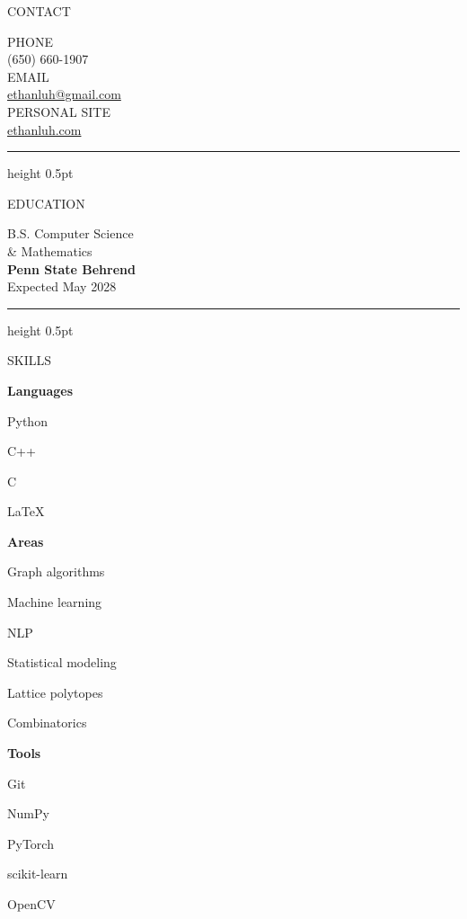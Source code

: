 \documentclass[10pt,letterpaper]{article}
\newcommand{\sechead}[1]{{\spacedboldfont\color{darktext}\fontsize{9.5}{11}\selectfont #1}\par\vspace{5pt}}
\newcommand{\subhead}[1]{{\bfseries\color{darktext}\fontsize{9.5}{12}\selectfont #1}}
\newcommand{\sidelabel}[1]{{\spacedfont\color{midgray}\fontsize{6.7}{9}\selectfont #1}}
\begin{document}
\begin{lrbox}{\sidebarbox}
\begin{minipage}[t]{2.55in}
\vspace{16pt}
\hspace{14pt}%
\begin{minipage}[t]{2.16in}

\sechead{CONTACT}
\sidelabel{PHONE}\\
{\fontsize{8.8}{12}\selectfont\color{darktext} (650) 660-1907}\\[7pt]
\sidelabel{EMAIL}\\
{\fontsize{8.8}{12}\selectfont\color{darktext} \href{mailto:ethanluh@gmail.com}{ethanluh@gmail.com}}\\[7pt]
\sidelabel{PERSONAL SITE}\\
{\fontsize{8.8}{12}\selectfont\color{darktext} \href{https://ethanluh.com}{ethanluh.com}}

\vspace{16pt}
{\color{lightrule}\hrule height 0.5pt}
\vspace{14pt}

\sechead{EDUCATION}
{\fontsize{8.8}{13}\selectfont\color{midgray} B.S. Computer Science\\ \& Mathematics}\\[3pt]
\subhead{\fontsize{9}{11}\selectfont Penn State Behrend}\\[2pt]
{\fontsize{8.3}{11.5}\selectfont\color{midgray} Expected May 2028}

\vspace{16pt}
{\color{lightrule}\hrule height 0.5pt}
\vspace{14pt}

\sechead{SKILLS}
{\fontsize{8.8}{11}\selectfont\color{darktext}
\textbf{Languages}
\begin{tightlist}
\item Python
\item C++
\item C
\item LaTeX
\end{tightlist}
\vspace{5pt}
\textbf{Areas}
\begin{tightlist}
\item Graph algorithms
\item Machine learning
\item NLP
\item Statistical modeling
\item Lattice polytopes
\item Combinatorics
\end{tightlist}
\vspace{5pt}
\textbf{Tools}
\begin{tightlist}
\item Git
\item NumPy
\item PyTorch
\item scikit-learn
\item OpenCV
\end{tightlist}
}


\end{minipage}
\end{minipage}
\end{lrbox}
\end{document}
